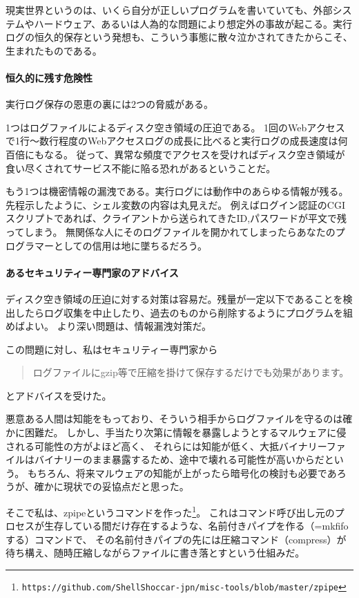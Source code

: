 現実世界というのは、いくら自分が正しいプログラムを書いていても、外部システムやハードウェア、あるいは人為的な問題により想定外の事故が起こる。実行ログの恒久的保存という発想も、こういう事態に散々泣かされてきたからこそ、生まれたものである。

\paragraph{恒久的に残す危険性}
実行ログ保存の恩恵の裏には2つの脅威がある。

1つはログファイルによるディスク空き領域の圧迫である。
1回のWebアクセスで1行〜数行程度のWebアクセスログの成長に比べると実行ログの成長速度は何百倍にもなる。
従って、異常な頻度でアクセスを受ければディスク空き領域が食い尽くされてサービス不能に陥る恐れがあるということだ。

もう1つは機密情報の漏洩である。実行ログには動作中のあらゆる情報が残る。先程示したように、シェル変数の内容は丸見えだ。
例えばログイン認証のCGIスクリプトであれば、クライアントから送られてきたID,パスワードが平文で残ってしまう。
無関係な人にそのログファイルを開かれてしまったらあなたのプログラマーとしての信用は地に墜ちるだろう。

\paragraph{あるセキュリティー専門家のアドバイス}
ディスク空き領域の圧迫に対する対策は容易だ。残量が一定以下であることを検出したらログ収集を中止したり、過去のものから削除するようにプログラムを組めばよい。
より深い問題は、情報漏洩対策だ。

この問題に対し、私はセキュリティー専門家から
\begin{quotation}
	\noindent
	ログファイルにgzip等で圧縮を掛けて保存するだけでも効果があります。
\end{quotation}
とアドバイスを受けた。

悪意ある人間は知能をもっており、そういう相手からログファイルを守るのは確かに困難だ。
しかし、手当たり次第に情報を暴露しようとするマルウェアに侵される可能性の方がよほど高く、
それらには知能が低く、大抵バイナリーファイルはバイナリーのまま暴露するため、途中で壊れる可能性が高いからだという。
もちろん、将来マルウェアの知能が上がったら暗号化の検討も必要であろうが、確かに現状での妥協点だと思った。

そこで私は、zpipeというコマンドを作った\footnote{\verb|https://github.com/ShellShoccar-jpn/misc-tools/blob/master/zpipe|}。
これはコマンド呼び出し元のプロセスが生存している間だけ存在するような、名前付きパイプを作る（=mkfifoする）コマンドで、
その名前付きパイプの先には圧縮コマンド（compress）が待ち構え、随時圧縮しながらファイルに書き落とすという仕組みだ。

